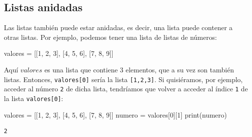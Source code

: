 \documentclass[
  letterpaper,
  DIV=11,
  numbers=noendperiod]{scrreprt}
\newenvironment{Shaded}{\begin{snugshade}}{\end{snugshade}}
\newcommand{\BuiltInTok}[1]{\textcolor[rgb]{0.00,0.23,0.31}{#1}}
\newcommand{\DecValTok}[1]{\textcolor[rgb]{0.68,0.00,0.00}{#1}}
\newcommand{\NormalTok}[1]{\textcolor[rgb]{0.00,0.23,0.31}{#1}}
\newcommand{\OperatorTok}[1]{\textcolor[rgb]{0.37,0.37,0.37}{#1}}
\begin{document}
\subsection{Listas anidadas}\label{listas-anidadas}

Las listas también puede estar anidadas, es decir, una lista puede
contener a otras listas. Por ejemplo, podemos tener una lista de listas
de números:

\begin{Shaded}
\begin{Highlighting}[]
\NormalTok{valores }\OperatorTok{=}\NormalTok{ [[}\DecValTok{1}\NormalTok{, }\DecValTok{2}\NormalTok{, }\DecValTok{3}\NormalTok{], [}\DecValTok{4}\NormalTok{, }\DecValTok{5}\NormalTok{, }\DecValTok{6}\NormalTok{], [}\DecValTok{7}\NormalTok{, }\DecValTok{8}\NormalTok{, }\DecValTok{9}\NormalTok{]]}
\end{Highlighting}
\end{Shaded}

Aquí \(valores\) es una lista que contiene 3 elementos, que a su vez son
también listas. Entonces, \texttt{valores{[}0{]}} sería la lista
\texttt{{[}1,2,3{]}}. Si quisiéramos, por ejemplo, acceder al número
\texttt{2} de dicha lista, tendríamos que volver a acceder al índice
\texttt{1} de la lista \texttt{valores{[}0{]}}:

\begin{Shaded}
\begin{Highlighting}[]
\NormalTok{valores }\OperatorTok{=}\NormalTok{ [[}\DecValTok{1}\NormalTok{, }\DecValTok{2}\NormalTok{, }\DecValTok{3}\NormalTok{], [}\DecValTok{4}\NormalTok{, }\DecValTok{5}\NormalTok{, }\DecValTok{6}\NormalTok{], [}\DecValTok{7}\NormalTok{, }\DecValTok{8}\NormalTok{, }\DecValTok{9}\NormalTok{]]}
\NormalTok{numero }\OperatorTok{=}\NormalTok{ valores[}\DecValTok{0}\NormalTok{][}\DecValTok{1}\NormalTok{]}
\BuiltInTok{print}\NormalTok{(numero)}
\end{Highlighting}
\end{Shaded}

\begin{verbatim}
2
\end{verbatim}
\end{document}
